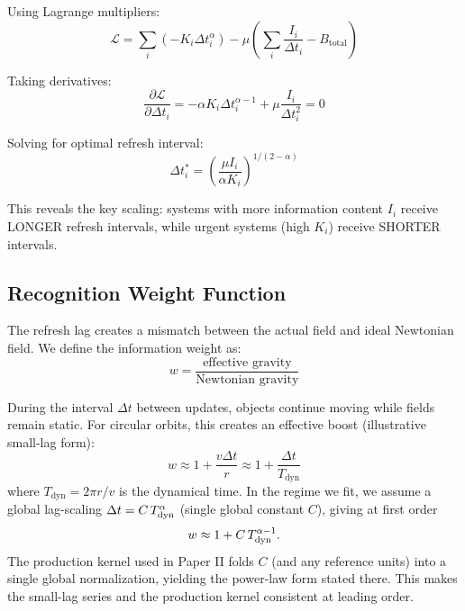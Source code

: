 \documentclass[usenatbib]{mnras}
\begin{document}
Using Lagrange multipliers:
\begin{equation}
\mathcal{L} = \sum_i (-K_i \Delta t_i^\alpha) - \mu\left(\sum_i \frac{I_i}{\Delta t_i} - B_{\text{total}}\right)
\end{equation}

Taking derivatives:
\begin{equation}
\frac{\partial \mathcal{L}}{\partial \Delta t_i} = -\alpha K_i \Delta t_i^{\alpha-1} + \mu \frac{I_i}{\Delta t_i^2} = 0
\end{equation}

Solving for optimal refresh interval:
\begin{equation}
\Delta t_i^* = \left(\frac{\mu I_i}{\alpha K_i}\right)^{1/(2-\alpha)}
\end{equation}

This reveals the key scaling: systems with more information content $I_i$ receive LONGER refresh intervals, while urgent systems (high $K_i$) receive SHORTER intervals.

\subsection{Recognition Weight Function}

The refresh lag creates a mismatch between the actual field and ideal Newtonian field. We define the information weight as:
\begin{equation}
w = \frac{\text{effective gravity}}{\text{Newtonian gravity}}
\end{equation}

During the interval $\Delta t$ between updates, objects continue moving while fields remain static. For circular orbits, this creates an effective boost (illustrative small-lag form):
\begin{equation}
w \approx 1 + \frac{v \Delta t}{r} \approx 1 + \frac{\Delta t}{T_{\text{dyn}}}
\end{equation}
where $T_{\text{dyn}} = 2\pi r/v$ is the dynamical time. In the regime we fit, we assume a global lag-scaling $\Delta t = C\,T_{\rm dyn}^{\alpha}$ (single global constant $C$), giving at first order
\begin{equation}
w \approx 1 + C\, T_{\rm dyn}^{\alpha-1}.
\end{equation}
The production kernel used in Paper II folds $C$ (and any reference units) into a single global normalization, yielding the power-law form stated there. This makes the small-lag series and the production kernel consistent at leading order.
\end{document}
